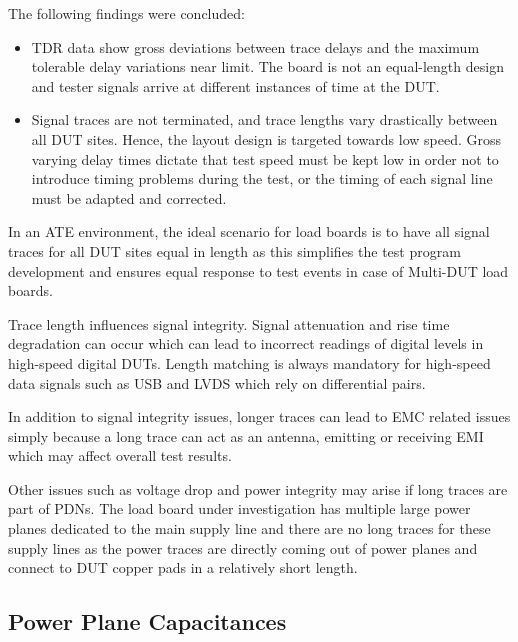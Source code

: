 The following findings were concluded:

\begin{itemize}[topsep=8pt,itemsep=4pt,partopsep=4pt, parsep=4pt]

    \item \ac{TDR} data show gross deviations between trace delays and the
    maximum tolerable delay variations near limit.
    The board is not an equal-length design and tester signals
    arrive at different instances of time at the DUT.

    \item Signal traces are not terminated, and trace lengths vary drastically
    between all \ac{DUT} sites.
    Hence, the layout design is targeted towards low speed.
    Gross varying delay times dictate that test speed must be kept low in order
    not to introduce timing problems during the test, or the timing of each signal
    line must be adapted and corrected.

\end{itemize}

In an \ac{ATE} environment, the ideal scenario for load boards is to have all
signal traces for all \ac{DUT} sites equal in length as
this simplifies the test program development and ensures equal response to test
events in case of Multi-\ac{DUT} load boards.

Trace length influences signal integrity.
Signal attenuation and rise time degradation
can occur which can lead to incorrect readings of digital levels
in high-speed digital \acp{DUT}.
Length matching is always mandatory for high-speed data signals such
as \ac{USB} and \ac{LVDS} which rely on differential pairs.

In addition to signal integrity issues, longer traces can lead to \ac{EMC}
related issues simply because a long trace can act as an antenna,
emitting or receiving \ac{EMI} which may affect overall test results.

Other issues such as voltage drop and power integrity may arise if long traces
are part of \acp{PDN}.
The load board under investigation has multiple large power planes dedicated
to the main supply line and there are no long traces for these supply lines as
the power traces are directly coming out of power planes and connect to \ac{DUT}
copper pads in a relatively short length.

\subsection{Power Plane Capacitances}
\label{subsec:loadboard-powerplane-capacitances}

